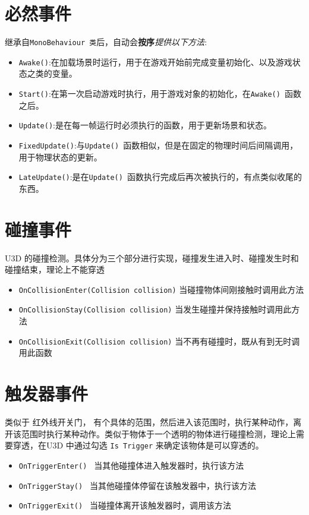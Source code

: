 \documentclass[UTF8,a4paper,12pt]{ctexbook}
\begin{document}
	\section{必然事件}
		继承自\verb|MonoBehaviour 类|后，自动会\textbf{按序}\textit{提供以下方法}:
		
		\begin{itemize}
			\item \verb|Awake()|:在加载场景时运行，用于在游戏开始前完成变量初始化、以及游戏状态之类的变量。
			\item \verb|Start()|:在第一次启动游戏时执行，用于游戏对象的初始化，在\verb|Awake() |函数之后。
			\item \verb|Update()|:是在每一帧运行时必须执行的函数，用于更新场景和状态。
			\item \verb|FixedUpdate()|:与\verb|Update() |函数相似，但是在固定的物理时间后间隔调用，用于物理状态的更新。
			\item \verb|LateUpdate()|:是在\verb|Update() |函数执行完成后再次被执行的，有点类似收尾的东西。 
		\end{itemize}
			
	\section{碰撞事件}
		U3D 的碰撞检测。具体分为三个部分进行实现，碰撞发生进入时、碰撞发生时和碰撞结束，理论上不能穿透
		
		\begin{itemize}
			\item \verb|OnCollisionEnter(Collision collision)| 当碰撞物体间刚接触时调用此方法
			\item \verb|OnCollisionStay(Collision collision)| 当发生碰撞并保持接触时调用此方法
			\item \verb|OnCollisionExit(Collision collision)| 当不再有碰撞时，既从有到无时调用此函数
		\end{itemize}

	\section{触发器事件}
		类似于 红外线开关门， 有个具体的范围，然后进入该范围时，执行某种动作，离开该范围时执行某种动作。类似于物体于一个透明的物体进行碰撞检测，理论上需要穿透，在U3D 中通过勾选 \verb|Is Trigger| 来确定该物体是可以穿透的。
		
		\begin{itemize}
			\item \verb|OnTriggerEnter() | 当其他碰撞体进入触发器时，执行该方法
			\item \verb|OnTriggerStay() | 当其他碰撞体停留在该触发器中，执行该方法
			\item \verb|OnTriggerExit() | 当碰撞体离开该触发器时，调用该方法
		\end{itemize}
		
\end{document}

